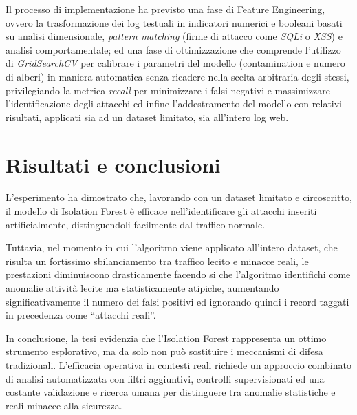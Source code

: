 Il processo di implementazione ha previsto una fase di \emph{}{Feature Engineering}, ovvero la trasformazione dei log testuali in indicatori numerici e booleani basati su analisi dimensionale, \emph{pattern matching} (firme di attacco come \emph{SQLi} o \emph{XSS}) e analisi comportamentale; ed una fase di ottimizzazione che comprende l’utilizzo di \emph{GridSearchCV} per calibrare i parametri del modello (contamination e numero di alberi) in maniera automatica senza ricadere nella scelta arbitraria degli stessi, privilegiando la metrica \emph{recall} per minimizzare i falsi negativi e massimizzare l'identificazione degli attacchi ed infine l'addestramento del modello con relativi risultati, applicati sia ad un dataset limitato, sia all'intero log web.

\section*{Risultati e conclusioni}

L’esperimento ha dimostrato che, lavorando con un dataset limitato e circoscritto, il modello di Isolation Forest è efficace nell’identificare gli attacchi inseriti artificialmente, distinguendoli facilmente dal traffico normale.

Tuttavia, nel momento in cui l’algoritmo viene applicato all’intero dataset, che risulta un fortissimo sbilanciamento tra traffico lecito e minacce reali, le prestazioni diminuiscono drasticamente facendo si che l’algoritmo identifichi come anomalie attività lecite ma statisticamente atipiche, aumentando significativamente il numero dei falsi positivi ed ignorando quindi i record taggati in precedenza come “attacchi reali”.

In conclusione, la tesi evidenzia che l’Isolation Forest rappresenta un ottimo strumento esplorativo, ma da solo non può sostituire i meccanismi di difesa tradizionali. L’efficacia operativa in contesti reali richiede un approccio combinato di analisi automatizzata con filtri aggiuntivi, controlli supervisionati ed una costante validazione e ricerca umana per distinguere tra anomalie statistiche e reali minacce alla sicurezza.